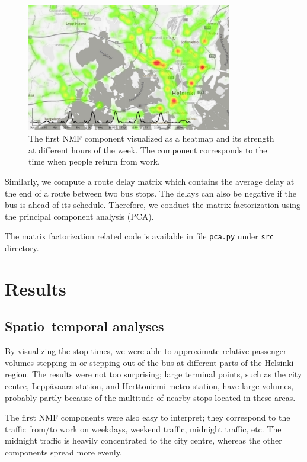 \documentclass[a4paper,12pt]{article}
\begin{document}
\begin{figure}
\centering
\includegraphics[width=0.8\textwidth]{nmf1.png}
\caption{The first NMF component visualized as a heatmap and its strength at 
different hours of the week. The component corresponds to the time when people 
return from work.}
\label{fig:nmf1}
\end{figure}

Similarly, we compute a route delay matrix which contains the average delay at 
the end of a route between two bus stops. The delays can also be negative if 
the bus is ahead of its schedule. Therefore, we conduct the matrix 
factorization using the principal component analysis (PCA).

The matrix factorization related code is available in file \texttt{pca.py} under
\texttt{src} directory.

\section{Results} \label{sec:res}

\subsection{Spatio--temporal analyses}

By visualizing the stop times, we were able to approximate relative passenger 
volumes stepping in or stepping out of the bus at different parts of the 
Helsinki region. The results were not too surprising; large terminal points, 
such as the city centre, Leppävaara station, and Herttoniemi metro station, 
have large volumes, probably partly because of the multitude of nearby stops 
located in these areas.

The first NMF components were also easy to interpret; 
they correspond to the traffic from/to work on weekdays, weekend traffic,
midnight traffic, etc. The midnight traffic is heavily concentrated to the city 
centre, whereas the other components spread more evenly.
\end{document}
